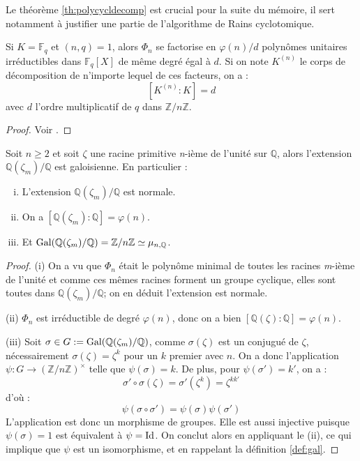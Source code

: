 \documentclass[a4paper]{article} %
\numberwithin{section}{part}
\numberwithin{equation}{section}
\newcommand\nroot[1]{\textit{#1}-ième}
\newcommand\zmodn[1]{\mathbb{Z}/#1\mathbb{Z}}
\newcommand\zmodninv[1]{(\mathbb{Z}/#1\mathbb{Z})^{\times}}
\newcommand\GF[1]{\mathbb{F}_{#1}}
\newcommand\QQ{\mathbb{Q}}
\begin{document}
Le théorème \ref{th:polycycldecomp} est crucial pour la suite du mémoire, il 
sert notamment à justifier une partie de l'algorithme de Rains cyclotomique.

\begin{thm}
\label{th:polycycldecomp}
Si $K = \GF{q}$ et $(n,q) = 1$, alors $\Phi_n$ se factorise en $\varphi(n)/d$ 
polynômes unitaires irréductibles dans $\GF{q}[X]$ de même degré égal à $d$. Si
on note $K^{(n)}$ le corps de décomposition de n'importe lequel de ces facteurs,
on a :
\[[K^{(n)}:K] = d\]
avec $d$ l'ordre multiplicatif de $q$ dans $\zmodn{n}$.
\end{thm}
\begin{proof}
Voir \cite[th. 2.47]{LiNi1}.
\end{proof}

\begin{prop}
\label{prop:cyclgal}
Soit $n \geq 2$ et soit $\zeta$ une racine primitive \nroot{n} de l'unité sur 
$\QQ$, alors l'extension $\QQ(\zeta_m)/\QQ$ est galoisienne. En particulier :
\begin{enumerate}[(i)]
\item L'extension $\QQ(\zeta_m)/\QQ$ est normale.

\item On a $[\QQ(\zeta_m):\QQ] = \varphi(n)$.

\item Et $\textup{Gal}(\QQ(\zeta_m)/\QQ) = \zmodn{n} \simeq \mu_{n,\QQ}$.
\end{enumerate}
\end{prop}
\begin{proof}
(i) On a vu que $\Phi_n$ était le polynôme minimal de toutes les racines 
\nroot{m} de l'unité et comme ces mêmes racines forment un groupe 
cyclique, elles sont toutes dans $\QQ(\zeta_m)/\QQ$; on en déduit l'extension 
est normale.\par
(ii) $\Phi_n$ est irréductible de degré $\varphi(n)$, donc on a bien
$[\QQ(\zeta):\QQ] = \varphi(n)$.\par
(iii) Soit $\sigma\in G := \textup{Gal}(\QQ(\zeta_m)/\QQ)$, comme 
$\sigma(\zeta)$ est un conjugué de $\zeta$, nécessairement $\sigma(\zeta) = 
\zeta^k$ pour un $k$ premier avec $n$. On a donc l'application $\psi : G \to 
\zmodninv{n}$ telle que $\psi(\sigma) = k$. De plus, pour $\psi(\sigma') = k'$, 
on a :
\[\sigma'\circ\sigma(\zeta) = \sigma'(\zeta^k) = \zeta^{kk'}\]
d'où :
\[\psi(\sigma\circ\sigma') = \psi(\sigma)\psi(\sigma')\]
L'application est donc un morphisme de groupes. Elle est aussi injective puisque
$\psi(\sigma) = 1$ est équivalent à $\psi = \textup{Id}$. On conclut alors en
appliquant le (ii), ce qui implique que $\psi$ est un isomorphisme, et en 
rappelant la définition \ref{def:gal}.
\end{proof}
\end{document}

